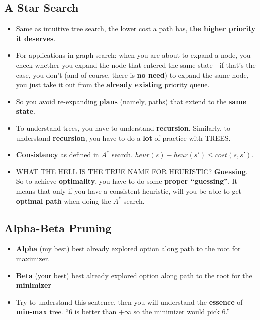 \documentclass[twocolumn]{article}
\begin{document}
\subsection{A Star Search}
\label{sec:star-search}

\begin{itemize}
\item Same as intuitive tree search, the lower cost a path has,
  \textbf{the higher priority it deserves}.
\item For applications in graph search: when you are about to expand a
  node, you check whether you expand the node that entered the same
  state---if  that's the case, you don't (and of course, there is
  \textbf{no need}) to expand the same node, you just take it out from
  the \textbf{already existing} priority queue.
\item So you avoid re-expanding \textbf{plans} (namely, paths) that
  extend to the \textbf{same state}.
\item To understand trees, you have to understand
  \textbf{recursion}. Similarly, to understand \textbf{recursion}, you
  have to do a \textbf{lot} of practice with TREES\@.
\item \textbf{Consistency} as defined in $A^{*}$
  search. $heur(s)-heur(s')\leq cost(s,s')$.
\item WHAT THE HELL IS THE TRUE NAME FOR HEURISTIC\@?
  \textbf{Guessing}. So to achieve \textbf{optimality}, you have to do
  some \textbf{proper ``guessing''}. It means that only if you have a
  consistent heuristic, will you be able to get \textbf{optimal path}
  when doing the $A^{*}$ search.
\end{itemize}

\subsection{Alpha-Beta Pruning}
\label{sec:alpha-beta-pruning}

\begin{itemize}
\item \textbf{Alpha} (my best) best already explored option along path
  to the root for maximizer.
\item \textbf{Beta} (your best) best already explored option along path to the
  root for the \textbf{minimizer}
\item Try to understand this sentence, then you will understand the
  \textbf{essence} of \textbf{min-max} tree. ``6 is better than
  $+\infty$ so the minimizer would pick 6.''
\end{itemize}
\end{document}
